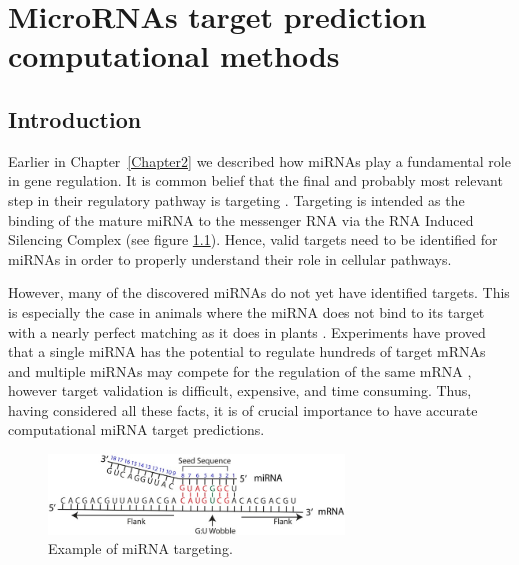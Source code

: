 
\chapter{MicroRNAs target prediction computational methods} %

\label{Chapter3} %



\section{Introduction}
Earlier in Chapter~\ref{Chapter2} we described how miRNAs play a fundamental role in gene regulation. It is common belief that the final and probably most relevant step in their regulatory pathway is targeting \cite{computational_methods}. Targeting is intended as the binding of the mature miRNA to the messenger RNA via the RNA Induced Silencing Complex (see figure \ref{fig:mirna_binding}). Hence, valid targets need to be identified for miRNAs in order to properly understand their role in cellular pathways. 

However, many of the discovered miRNAs do not yet have identified targets. This is especially the case in animals where the miRNA does not bind to its target with a nearly perfect matching as it does in plants \cite{perfect_matching}. Experiments have proved that a single miRNA has the potential to regulate hundreds of target mRNAs and multiple miRNAs may compete for the regulation of the same mRNA \cite{multiple_binds}, however target validation is difficult, expensive, and time consuming. Thus, having considered all these facts, it is of crucial importance to have accurate computational miRNA target predictions.

\begin{figure}[hbt!]
	\centering
	\includegraphics[width=0.7\textwidth]{Figures/seed_match}
	\caption{Example of miRNA targeting.}
	\label{fig:mirna_binding}
\end{figure}


